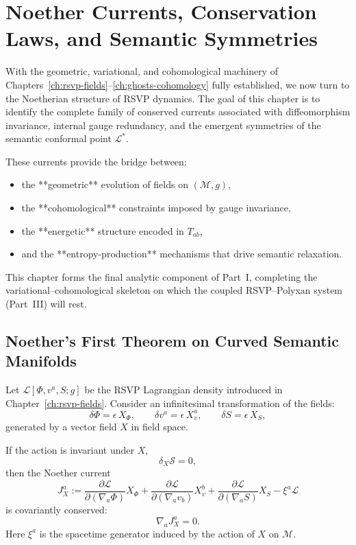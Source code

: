\chapter{Noether Currents, Conservation Laws, and Semantic Symmetries}
\label{ch:noether}

With the geometric, variational, and cohomological machinery of
Chapters~\ref{ch:rsvp-fields}–\ref{ch:ghosts-cohomology} fully established,
we now turn to the Noetherian structure of RSVP dynamics.  
The goal of this chapter is to identify the complete family of conserved
currents associated with diffeomorphism invariance, internal gauge redundancy,
and the emergent symmetries of the semantic conformal point $\mathcal{L}^*$.

These currents provide the bridge between:

\begin{itemize}
\item the **geometric** evolution of fields on $(\mathcal{M},g)$,
\item the **cohomological** constraints imposed by gauge invariance,
\item the **energetic** structure encoded in $T_{ab}$,
\item and the **entropy-production** mechanisms that drive semantic relaxation.
\end{itemize}

This chapter forms the final analytic component of Part~I, completing the 
variational–cohomological skeleton on which the coupled RSVP--Polyxan system
(Part~III) will rest.

\section{Noether's First Theorem on Curved Semantic Manifolds}

Let $\mathcal{L}[\Phi, v^a, S;g]$ be the RSVP Lagrangian density introduced in
Chapter~\ref{ch:rsvp-fields}.  
Consider an infinitesimal transformation of the fields:
\[
\delta \Phi = \epsilon\, X_\Phi, \qquad
\delta v^a = \epsilon\, X_v^a, \qquad
\delta S = \epsilon\, X_S,
\]
generated by a vector field $X$ in field space.

\begin{theorem}
If the action is invariant under $X$,
\[
\delta_X \mathcal{S} = 0,
\]
then the Noether current
\[
J^a_X
  := \frac{\partial \mathcal{L}}{\partial (\nabla_a \Phi)} X_\Phi
   + \frac{\partial \mathcal{L}}{\partial (\nabla_a v_b)} X_v^b
   + \frac{\partial \mathcal{L}}{\partial (\nabla_a S)} X_S
   - \xi^a \mathcal{L}
\]
is covariantly conserved:
\[
\nabla_a J^a_X = 0.
\]
Here $\xi^a$ is the spacetime generator induced by the action of $X$ on $\mathcal{M}$.
\end{theorem}

